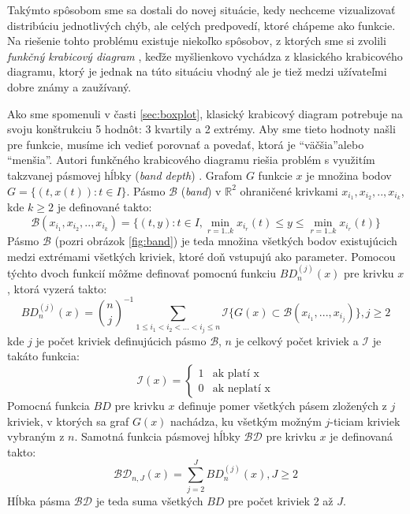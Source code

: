 Takýmto spôsobom sme sa dostali do novej situácie, kedy nechceme vizualizovať distribúciu jednotlivých chýb, ale celých predpovedí, ktoré chápeme ako funkcie. Na riešenie tohto problému existuje niekoľko spôsobov, z ktorých sme si zvolili \textit{funkčný krabicový diagram} \cite{FunctionalBoxplot}, keďže myšlienkovo vychádza z klasického krabicového diagramu, ktorý je jednak na túto situáciu vhodný ale je tiež medzi užívateľmi dobre známy a zaužívaný.

Ako sme spomenuli v časti \ref{sec:boxplot}, klasický krabicový diagram potrebuje na svoju konštrukciu 5 hodnôt: 3 kvartily a 2 extrémy. Aby sme tieto hodnoty našli pre funkcie, musíme ich vedieť porovnať a povedať, ktorá je \textquotedblleft väčšia\textquotedblright alebo \textquotedblleft menšia\textquotedblright. Autori funkčného krabicového diagramu riešia problém s využitím takzvanej pásmovej hĺbky (\textit{band depth}) \cite{BandDepth}. Grafom $ G $ funkcie $ x $ je množina bodov $ G = \{ (t,x(t)) : t \in I \} $. Pásmo $ \mathcal{B} $ (\textit{band}) v $ \mathbb{R}^{2}  $ ohraničené krivkami $ x_{i_{1}}, x_{i_{2}}, .. , x_{i_{k}} $, kde $ k \geq 2 $ je definované takto:
\[
	\mathcal{B}(x_{i_{1}}, x_{i_{2}}, .. , x_{i_{k}}) = \{ (t,y) : t \in I, \min_{r=1..k}x_{i_{r}}(t) \leq y \leq \min_{r=1..k}x_{i_{r}}(t) \}
\]
Pásmo $ \mathcal{B} $ (pozri obrázok \ref{fig:band}) je teda množina všetkých bodov existujúcich medzi extrémami všetkých kriviek, ktoré doň vstupujú ako parameter. 
Pomocou týchto dvoch funkcií môžme definovať pomocnú funkciu $ BD_{n}^{(j)}(x) $ pre krivku $ x $, ktorá vyzerá takto:
\[
	BD^{(j)}_{n}(x) = {n \choose j}^{-1} \sum_{1 \leq i_{1} < i_{2} < ... < i_{j} \leq n} \mathcal{I}\{ G(x) \subset \mathcal{B}(x_{i_{1}}, ... ,x_{i_{j}}) \}, j \geq 2
\]
kde $ j $ je počet kriviek definujúcich pásmo $ \mathcal{B} $, $ n $ je celkový počet kriviek a $ \mathcal{I} $ je takáto funkcia:
\[
	\mathcal{I}(x) = \left\{
	\begin{array}{ll}
	1 & \mbox{ak platí x}  \\
	0 & \mbox{ak neplatí x} 
	\end{array}
	\right.
\]
Pomocná funkcia $ BD $ pre krivku $ x $ definuje pomer všetkých pásem zložených z $ j $ kriviek, v ktorých sa graf $ G(x) $ nachádza, ku všetkým možným $ j $-ticiam kriviek vybraným z $ n $. 
Samotná funkcia pásmovej hĺbky $ \mathcal{BD} $ pre krivku $ x $ je definovaná takto:
\[
	\mathcal{BD}_{n, J}(x) = \sum_{j = 2}^{J} BD^{(j)}_{n}(x), J \geq 2
\]
Hĺbka pásma $ \mathcal{BD} $ je teda suma všetkých $ BD $ pre počet kriviek 2 až $ J $.

